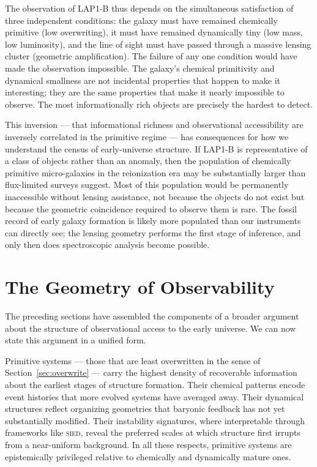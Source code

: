 \documentclass[12pt, a4paper]{article}
\newcommand{\SIED}{\textsc{sied}}
\theoremstyle{definition}
\begin{document}
The observation of LAP1-B thus depends on the simultaneous satisfaction of
three independent conditions: the galaxy must have remained chemically primitive
(low overwriting), it must have remained dynamically tiny (low mass, low
luminosity), and the line of sight must have passed through a massive lensing
cluster (geometric amplification). The failure of any one condition would have
made the observation impossible. The galaxy's chemical primitivity and
dynamical smallness are not incidental properties that happen to make it
interesting; they are the same properties that make it nearly impossible to
observe. The most informationally rich objects are precisely the hardest to
detect.

This inversion --- that informational richness and observational accessibility
are inversely correlated in the primitive regime --- has consequences for how
we understand the census of early-universe structure. If LAP1-B is
representative of a class of objects rather than an anomaly, then the
population of chemically primitive micro-galaxies in the reionization era may
be substantially larger than flux-limited surveys suggest. Most of this
population would be permanently inaccessible without lensing assistance, not
because the objects do not exist but because the geometric coincidence required
to observe them is rare. The fossil record of early galaxy formation is likely
more populated than our instruments can directly see; the lensing geometry
performs the first stage of inference, and only then does spectroscopic
analysis become possible.

\section{The Geometry of Observability}
\label{sec:clio}

The preceding sections have assembled the components of a broader argument
about the structure of observational access to the early universe. We can
now state this argument in a unified form.

Primitive systems --- those that are least overwritten in the sense of
Section~\ref{sec:overwrite} --- carry the highest density of recoverable
information about the earliest stages of structure formation. Their chemical
patterns encode event histories that more evolved systems have averaged away.
Their dynamical structures reflect organizing geometries that baryonic
feedback has not yet substantially modified. Their instability signatures,
where interpretable through frameworks like \SIED{}, reveal the preferred
scales at which structure first irrupts from a near-uniform background. In
all these respects, primitive systems are epistemically privileged relative
to chemically and dynamically mature ones.
\end{document}
